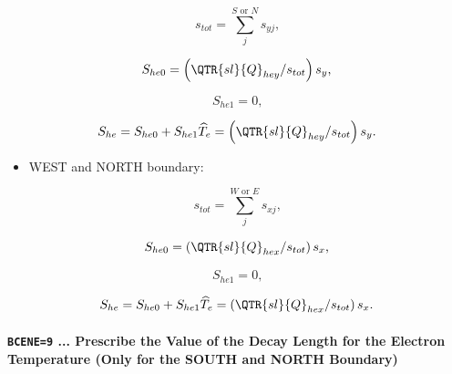 \documentclass[11pt]{article}
\begin{document}
\bigskip

\begin{equation}
s_{tot}=\sum_{j}^{S\text{ or }N}s_{yj}\text{,}   \label{c214}
\end{equation}

\begin{equation}
S_{he0}=\left( \QTR{sl}{Q}_{hey}/s_{tot}\right) s_{y}\text{,}   \label{c215}
\end{equation}

\begin{equation}
S_{he1}=0\text{,}   \label{c216}
\end{equation}

\begin{equation}
S_{he}=S_{he0}+S_{he1}\widehat{T}_{e}=\left( \QTR{sl}{Q}_{hey}/s_{tot}%
\right) s_{y}\text{.}   \label{c217}
\end{equation}

\bigskip

\begin{itemize}
\item  WEST and NORTH boundary:
\end{itemize}

\bigskip

\begin{equation}
s_{tot}=\sum_{j}^{W\text{ or }E}s_{xj}\text{,}   \label{c218}
\end{equation}

\begin{equation}
S_{he0}=\left( \QTR{sl}{Q}_{hex}/s_{tot}\right) s_{x}\text{,}   \label{c219}
\end{equation}

\begin{equation}
S_{he1}=0\text{,}   \label{c220}
\end{equation}

\begin{equation}
S_{he}=S_{he0}+S_{he1}\widehat{T}_{e}=\left( \QTR{sl}{Q}_{hex}/s_{tot}%
\right) s_{x}\text{.}   \label{c221}
\end{equation}

\bigskip

\paragraph{\texttt{BCENE=9} ... Prescribe the Value of the Decay Length for
the Electron Temperature (Only for the SOUTH and NORTH Boundary)}

\bigskip
\end{document}
